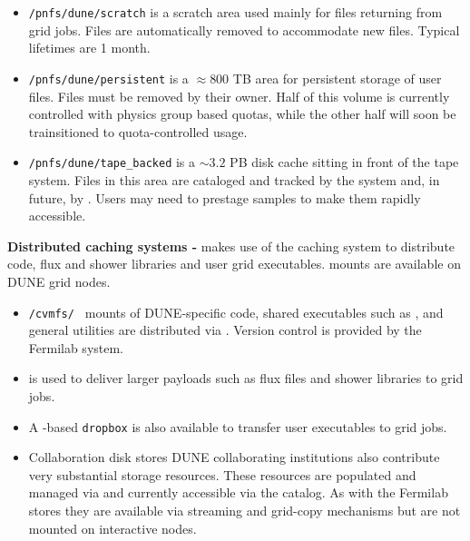 \documentclass[../main-v1.tex]{subfiles}
\begin{document}
\begin{description}
\begin{itemize}
    \item {\tt /pnfs/dune/scratch}  is a scratch area used mainly for files returning from grid jobs.  Files are automatically removed to accommodate new files. Typical lifetimes are 1 month. 
     \item {\tt /pnfs/dune/persistent} is a $\approx 800$ TB area for persistent storage of user files.  Files must be removed by their owner. Half of this volume is currently controlled with physics group based quotas, while the other half will soon be trainsitioned to quota-controlled usage.
      \item {\tt /pnfs/dune/tape\_backed} is a $\sim 3.2$ PB disk cache sitting in front of the  tape system. Files in this area are cataloged and tracked by the  system and, in future, by . Users may need to prestage samples to make them rapidly accessible. 
\end{itemize}
\item{\bf Distributed caching systems - }  makes use of the  caching system to distribute code, flux and shower libraries and user grid executables.  mounts are available on DUNE grid nodes. 



\begin{itemize}
    \item {\tt /cvmfs/ } mounts of DUNE-specific code,  shared executables such as , and general utilities are distributed via . Version control is provided by the Fermilab  system. 
    
    \item {} is used to deliver larger payloads such as flux files and shower libraries to grid jobs.
    
    \item A -based  {\tt dropbox} is also available to transfer user executables to grid jobs. 
    
    



\item{Collaboration disk stores}
DUNE collaborating institutions also contribute very substantial storage resources. These resources are populated and managed via  and currently accessible via the  catalog. As with the Fermilab  stores they are available via streaming and grid-copy mechanisms but are not mounted on interactive nodes. 
 \end{itemize}


\end{description}
\end{document}
